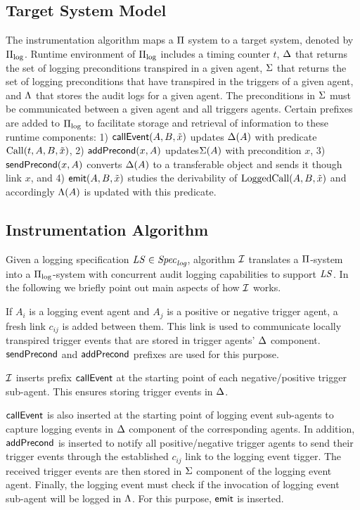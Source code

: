 \subsection{Target System Model} \label{sec:pi-log}
The instrumentation algorithm maps a $\Pi$ system to a target system, denoted by $\Pi_{\mathrm{log}}$. Runtime environment of $\Pi_{\mathrm{log}}$ includes a timing counter $t$, $\Delta$ that returns the set of logging preconditions transpired in a given agent, $\Sigma$ that returns the set of logging preconditions that have transpired in the triggers of a given agent, and $\Lambda$ that stores the audit logs for a given agent. The preconditions in $\Sigma$ must be communicated between a given agent and all triggers agents. Certain prefixes are added to $\Pi_{\mathrm{log}}$ to facilitate storage and retrieval of information to these runtime components: 1) $\mathsf{callEvent}(A,B,\tilde{x})$ updates $\Delta(A)$ with predicate $\mathrm{Call}(t,A,B,\tilde{x})$, 2) $\mathsf{addPrecond}(x,A)$ updates$\Sigma(A)$ with precondition $x$, 3) $\mathsf{sendPrecond}(x,A)$ converts $\Delta(A)$ to a transferable object and sends it though link $x$, and 4) $\mathsf{emit}(A,B,\tilde{x})$ studies the derivability of $\mathrm{LoggedCall}(A,B,\tilde{x})$ and accordingly $\Lambda(A)$ is updated with this predicate. 


\subsection{Instrumentation Algorithm} \label{sec:inst-alg}
Given a logging specification $\mathit{LS} \in {\mathit{Spec}_{\mathit{log}}}$, algorithm $\mathcal{I}$ translates a $\Pi$-system into a $\Pi_{\mathrm{log}}$-system with concurrent audit logging capabilities to support $\mathit{LS}$. In the following we briefly point out main aspects of how $\mathcal{I}$ works. 

If $A_i$ is a logging event agent and $A_j$ is a positive or negative trigger agent, a fresh link $c_{ij}$ is added between them. This link is used to communicate locally transpired trigger events that are stored in trigger agents' $\Delta$ component. $\mathsf{sendPrecond}$ and $\mathsf{addPrecond}$ prefixes are used for this purpose.

$\mathcal{I}$ inserts prefix $\mathsf{callEvent}$ at the starting point of each negative/positive trigger sub-agent. This ensures storing trigger events in $\Delta$. 

$\mathsf{callEvent}$  is also inserted at the starting point of logging event sub-agents to capture logging events in $\Delta$ component of the corresponding agents. In addition, $\mathsf{addPrecond}$ is inserted to notify all positive/negative trigger agents to send their trigger events through the established $c_{ij}$ link to the logging event tigger. The received trigger events are then stored in $\Sigma$ component of the logging event agent. Finally, the logging event must check if the invocation of logging event sub-agent will be logged in $\Lambda$. For this purpose, $\mathsf{emit}$ is inserted.

